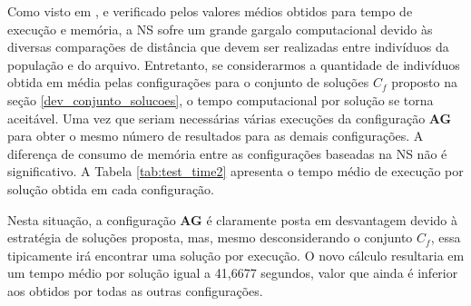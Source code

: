 Como visto em \cite{cuccu2011novelty}, e verificado pelos valores médios obtidos para tempo de execução e memória, a NS sofre um grande gargalo computacional devido às diversas comparações de distância que devem ser realizadas entre indivíduos da população e do arquivo. Entretanto, se considerarmos a quantidade de indivíduos obtida em média pelas configurações para o conjunto de soluções $C_f$ proposto na seção \ref{dev_conjunto_solucoes}, o tempo computacional por solução se torna aceitável. Uma vez que seriam necessárias várias execuções da configuração \textbf{AG} para obter o mesmo número de resultados para as demais configurações. A diferença de consumo de memória entre as configurações baseadas na NS não é significativo. A Tabela \ref{tab:test_time2} apresenta o tempo médio de execução por solução obtida em cada configuração.

\begin{table}[htb]
\centering
\caption{Tempo médio de execução por solução obtida em cada configuração.}
\label{tab:test_time2}
\end{table}

Nesta situação, a configuração \textbf{AG} é claramente posta em desvantagem devido à estratégia de soluções proposta, mas, mesmo desconsiderando o conjunto $C_f$, essa tipicamente irá encontrar uma solução por execução. O novo cálculo resultaria em um tempo médio por solução igual a 41,6677 segundos, valor que ainda é inferior aos obtidos por todas as outras configurações.

